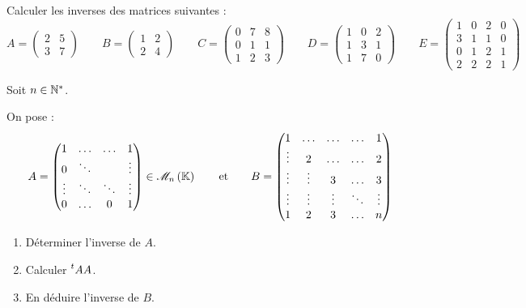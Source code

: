\begin{corr}
\end{corr}

\begin{exo}[Exercice 7]
Calculer les inverses des matrices suivantes : \[A=\begin{pmatrix}
2 & 5 \\
3 & 7
\end{pmatrix}\qquad B=\begin{pmatrix}
1 & 2 \\
2 & 4
\end{pmatrix}\qquad C=\begin{pmatrix}
0 & 7 & 8 \\
0 & 1 & 1 \\
1 & 2 & 3
\end{pmatrix}\qquad D=\begin{pmatrix}
1 & 0 & 2 \\
1 & 3 & 1 \\
1 & 7 & 0
\end{pmatrix}\qquad E=\begin{pmatrix}
1 & 0 & 2 & 0 \\
3 & 1 & 1 & 0 \\
0 & 1 & 2 & 1 \\
2 & 2 & 2 & 1
\end{pmatrix}\]
\end{exo}

\begin{corr}
\end{corr}

\begin{exo}[Exercice 8]
Soit \(n\in\mathbb{N}^*\).

On pose : \[A=\begin{pmatrix}
1 & \dots & \dots & 1 \\
0 & \ddots &  & \vdots \\
\vdots & \ddots & \ddots & \vdots \\
0 & \dots & 0 & 1
\end{pmatrix}\in\M{n}\qquad\text{et}\qquad B=\begin{pmatrix}
1 & \dots & \dots & \dots & 1 \\
\vdots & 2 & \dots & \dots & 2 \\
\vdots & \vdots & 3 & \dots & 3 \\
\vdots & \vdots & \vdots & \ddots & \vdots \\
1 & 2 & 3 & \dots & n
\end{pmatrix}\]

\begin{enumerate}
\item Déterminer l'inverse de \(A\). \\

\item Calculer \(\prescript{t}{}{A}A\). \\

\item En déduire l'inverse de \(B\).
\end{enumerate}
\end{exo}

